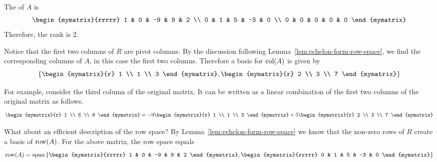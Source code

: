 \begin{solution}
  The {\rref} of $A$ is
  \begin{equation*}
    \begin{mymatrix}{rrrrr}
      1 & 0 & -9 & 9 & 2 \\
      0 & 1 & 5 & -3 & 0 \\
      0 & 0 & 0 & 0 & 0
    \end{mymatrix}
  \end{equation*}
  Therefore, the rank is $2$.

  Notice that the first two columns of $R$ are pivot columns. By the
  discussion following Lemma~\ref{lem:echelon-form-row-space}, we find
  the corresponding columns of $A$, in this case the first two
  columns. Therefore a basis for $\mbox{\rm col}(A)$ is given by
  \begin{equation*}
    \set{\begin{mymatrix}{r}
        1 \\
        1 \\
        3
      \end{mymatrix} , \begin{mymatrix}{r}
        2 \\
        3 \\
        7
      \end{mymatrix}
    }
  \end{equation*}

  For example, consider the third column of the original matrix. It
  can be written as a linear combination of the first two columns of
  the original matrix as follows.
  \begin{equation*}
    \begin{mymatrix}{r}
      1 \\
      6 \\
      8
    \end{mymatrix} =-9\begin{mymatrix}{r}
      1 \\
      1 \\
      3
    \end{mymatrix} +5\begin{mymatrix}{r}
      2 \\
      3 \\
      7
    \end{mymatrix}
  \end{equation*}

  What about an efficient description of the row space? By
  Lemma~\ref{lem:echelon-form-row-space} we know that the non-zero
  rows of $R$ create a basis of $\mbox{\rm row}(A)$.  For the above
  matrix, the row space equals
  \begin{equation*}
    \func{row}(A) =
    \sspan \set{
      \begin{mymatrix}{rrrrr}
        1 & 0 & -9 & 9 & 2
      \end{mymatrix}, \begin{mymatrix}{rrrrr}
        0 & 1 & 5 & -3 & 0
      \end{mymatrix}
    }
  \end{equation*}
\end{solution}


